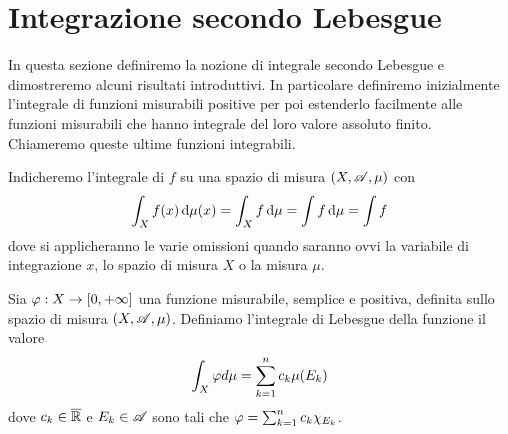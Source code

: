 \section{Integrazione secondo Lebesgue}
In questa sezione definiremo la nozione di integrale secondo Lebesgue e dimostreremo alcuni risultati introduttivi. In particolare definiremo inizialmente l'integrale di funzioni misurabili positive per poi estenderlo facilmente alle funzioni misurabili che hanno integrale del loro valore assoluto finito. Chiameremo queste ultime funzioni integrabili.

\begin{remark}
	Indicheremo l'integrale di $f$ su una spazio di misura $(X,\mathscr A,\mu)$ con 
	\begin{equation*}
		\int_X f(x) \,\mathrm d \mu(x)=\int_X f \,\mathrm d \mu=\int f \,\mathrm d \mu=\int f
	\end{equation*}
	dove si applicheranno le varie omissioni quando saranno ovvi la variabile di integrazione $x$, lo spazio di misura $X$ o la misura $\mu$.
\end{remark}

\begin{definition}\label{def:IntegraleSemplici}
	Sia $\varphi:X\to [0,+\infty]$ una funzione misurabile, semplice e positiva, definita sullo spazio di misura $(X,\mathscr A,\mu)$. Definiamo l'integrale di Lebesgue della funzione il valore
	\begin{equation*}
		\int_X \varphi d \mu = \sum_{k=1}^n c_k\mu(E_k)
	\end{equation*}
	dove $c_k\in \overline{\mathbb R}$ e $E_k \in \mathscr A$ sono tali che $\varphi=\sum_{k=1}^nc_k\chi_{E_k}$.
\end{definition}

